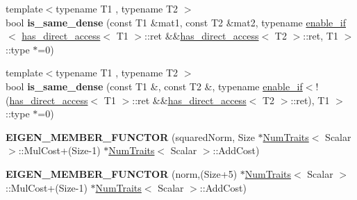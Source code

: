 \begin{DoxyCompactItemize}
\item 
\mbox{\label{namespace_eigen_1_1internal_ae3479b3708befc55b8b7bba82f95266f}} 
{\footnotesize template$<$typename T1 , typename T2 $>$ }\\bool {\bfseries is\+\_\+same\+\_\+dense} (const T1 \&mat1, const T2 \&mat2, typename \hyperlink{struct_eigen_1_1internal_1_1enable__if}{enable\+\_\+if}$<$ \hyperlink{struct_eigen_1_1internal_1_1has__direct__access}{has\+\_\+direct\+\_\+access}$<$ T1 $>$\+::ret \&\&\hyperlink{struct_eigen_1_1internal_1_1has__direct__access}{has\+\_\+direct\+\_\+access}$<$ T2 $>$\+::ret, T1 $>$\+::type $\ast$=0)
\item 
\mbox{\label{namespace_eigen_1_1internal_af3f96a40e763c67bae52aee4bd009d8c}} 
{\footnotesize template$<$typename T1 , typename T2 $>$ }\\bool {\bfseries is\+\_\+same\+\_\+dense} (const T1 \&, const T2 \&, typename \hyperlink{struct_eigen_1_1internal_1_1enable__if}{enable\+\_\+if}$<$!(\hyperlink{struct_eigen_1_1internal_1_1has__direct__access}{has\+\_\+direct\+\_\+access}$<$ T1 $>$\+::ret \&\&\hyperlink{struct_eigen_1_1internal_1_1has__direct__access}{has\+\_\+direct\+\_\+access}$<$ T2 $>$\+::ret), T1 $>$\+::type $\ast$=0)
\item 
\mbox{\label{namespace_eigen_1_1internal_ab39eeebdbbd13c2d3a1cc14318f82b7c}} 
{\bfseries E\+I\+G\+E\+N\+\_\+\+M\+E\+M\+B\+E\+R\+\_\+\+F\+U\+N\+C\+T\+OR} (squared\+Norm, Size $\ast$\hyperlink{group___core___module_struct_eigen_1_1_num_traits}{Num\+Traits}$<$ Scalar $>$\+::Mul\+Cost+(Size-\/1) $\ast$\hyperlink{group___core___module_struct_eigen_1_1_num_traits}{Num\+Traits}$<$ Scalar $>$\+::Add\+Cost)
\item 
\mbox{\label{namespace_eigen_1_1internal_af0728ee4134f879abe9121af16def656}} 
{\bfseries E\+I\+G\+E\+N\+\_\+\+M\+E\+M\+B\+E\+R\+\_\+\+F\+U\+N\+C\+T\+OR} (norm,(Size+5) $\ast$\hyperlink{group___core___module_struct_eigen_1_1_num_traits}{Num\+Traits}$<$ Scalar $>$\+::Mul\+Cost+(Size-\/1) $\ast$\hyperlink{group___core___module_struct_eigen_1_1_num_traits}{Num\+Traits}$<$ Scalar $>$\+::Add\+Cost)
\item 
\mbox{\label{namespace_eigen_1_1internal_aba307df48bf366dbd67f8874a8c17834}} 

\end{DoxyCompactItemize}
